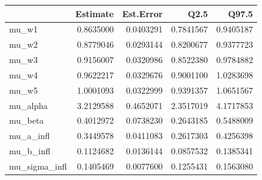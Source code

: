 
\begin{tabular}{lrrrr}
\toprule
  & Estimate & Est.Error & Q2.5 & Q97.5\\
\midrule
mu\_w1 & 0.8635000 & 0.0403291 & 0.7841567 & 0.9405187\\
mu\_w2 & 0.8779046 & 0.0293144 & 0.8200677 & 0.9377723\\
mu\_w3 & 0.9156007 & 0.0320986 & 0.8522380 & 0.9784882\\
mu\_w4 & 0.9622217 & 0.0329676 & 0.9001100 & 1.0283698\\
mu\_w5 & 1.0001093 & 0.0322999 & 0.9391357 & 1.0651567\\
\addlinespace
mu\_alpha & 3.2129588 & 0.4652071 & 2.3517019 & 4.1717853\\
mu\_beta & 0.4012972 & 0.0738230 & 0.2643185 & 0.5488009\\
mu\_a\_infl & 0.3449578 & 0.0411083 & 0.2617303 & 0.4256398\\
mu\_b\_infl & 0.1124682 & 0.0136144 & 0.0857532 & 0.1385341\\
mu\_sigma\_infl & 0.1405469 & 0.0077600 & 0.1255431 & 0.1563080\\
\bottomrule
\end{tabular}
